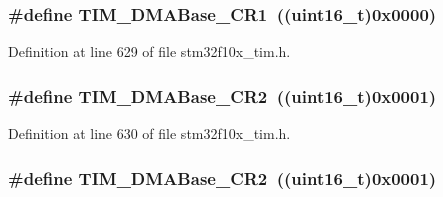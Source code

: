 \subsubsection[{\texorpdfstring{T\+I\+M\+\_\+\+D\+M\+A\+Base\+\_\+\+C\+R1}{TIM_DMABase_CR1}}]{\setlength{\rightskip}{0pt plus 5cm}\#define T\+I\+M\+\_\+\+D\+M\+A\+Base\+\_\+\+C\+R1~(({\bf uint16\+\_\+t})0x0000)}\hypertarget{group___t_i_m___d_m_a___base__address_ga73bca5b14da2d5026fa3877d0db53740}{}\label{group___t_i_m___d_m_a___base__address_ga73bca5b14da2d5026fa3877d0db53740}


Definition at line 629 of file stm32f10x\+\_\+tim.\+h.

\subsubsection[{\texorpdfstring{T\+I\+M\+\_\+\+D\+M\+A\+Base\+\_\+\+C\+R2}{TIM_DMABase_CR2}}]{\setlength{\rightskip}{0pt plus 5cm}\#define T\+I\+M\+\_\+\+D\+M\+A\+Base\+\_\+\+C\+R2~(({\bf uint16\+\_\+t})0x0001)}\hypertarget{group___t_i_m___d_m_a___base__address_ga50e894f0d2cecc1ff3a3578098c3246e}{}\label{group___t_i_m___d_m_a___base__address_ga50e894f0d2cecc1ff3a3578098c3246e}


Definition at line 630 of file stm32f10x\+\_\+tim.\+h.

\subsubsection[{\texorpdfstring{T\+I\+M\+\_\+\+D\+M\+A\+Base\+\_\+\+C\+R2}{TIM_DMABase_CR2}}]{\setlength{\rightskip}{0pt plus 5cm}\#define T\+I\+M\+\_\+\+D\+M\+A\+Base\+\_\+\+C\+R2~(({\bf uint16\+\_\+t})0x0001)}\hypertarget{group___t_i_m___d_m_a___base__address_ga50e894f0d2cecc1ff3a3578098c3246e}{}\label{group___t_i_m___d_m_a___base__address_ga50e894f0d2cecc1ff3a3578098c3246e}


